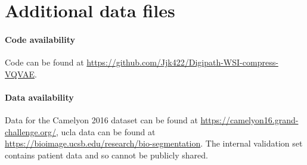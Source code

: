 \documentclass[review]{elsarticle}
\begin{document}
\section{Additional data files}
\paragraph{Code availability} Code can be found at \url{https://github.com/Jjk422/Digipath-WSI-compress-VQVAE}.
\paragraph{Data availability} Data for the Camelyon 2016 dataset can be found at \url{https://camelyon16.grand-challenge.org/}, \gls{ucla} data can be found at \url{https://bioimage.ucsb.edu/research/bio-segmentation}. The internal validation set contains patient data and so cannot be publicly shared.
\end{document}
